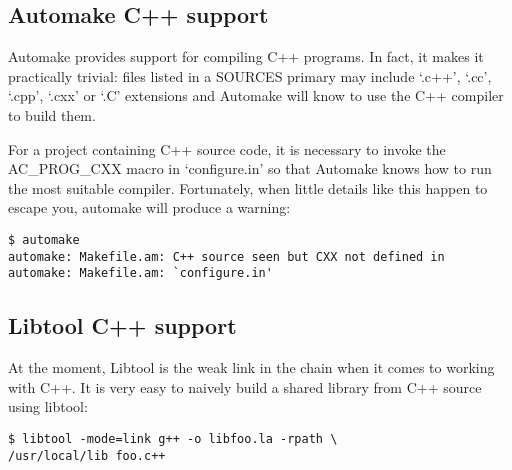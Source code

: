 \subsection{Automake C++ support}

Automake provides support for compiling C++ programs. In fact, it makes it 
practically trivial: files listed in a SOURCES primary may 
include `.c++', `.cc', `.cpp', `.cxx' or `.C' extensions and Automake will 
know to use the C++ compiler to build them.

For a project containing C++ source code, it is necessary to invoke 
the AC\_{}PROG\_{}CXX macro in `configure.in' so that Automake knows 
how to run the most suitable compiler. Fortunately, when little details like 
this happen to escape you, automake will produce a warning:

 	

\begin{verbatim}
$ automake
automake: Makefile.am: C++ source seen but CXX not defined in
automake: Makefile.am: `configure.in'
\end{verbatim}

\subsection{Libtool C++ support}

At the moment, Libtool is the weak link in the chain when it comes to working with C++. It is very easy to naively build a shared library from C++ source using libtool: 

\begin{Verbatim}[frame=single]
$ libtool -mode=link g++ -o libfoo.la -rpath \
/usr/local/lib foo.c++
\end{Verbatim}

